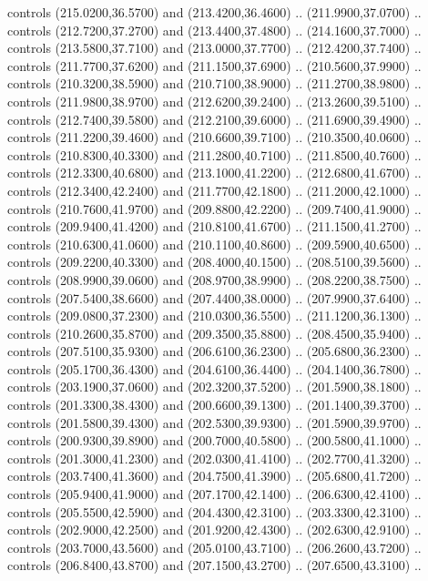 {\begin{scope}[y=0.80pt, x=0.80pt, yscale=-1, xscale=1, inner sep=0pt, outer sep=0pt, #1]
      controls (215.0200,36.5700) and (213.4200,36.4600) .. (211.9900,37.0700) ..
      controls (212.7200,37.2700) and (213.4400,37.4800) .. (214.1600,37.7000) ..
      controls (213.5800,37.7100) and (213.0000,37.7700) .. (212.4200,37.7400) ..
      controls (211.7700,37.6200) and (211.1500,37.6900) .. (210.5600,37.9900) ..
      controls (210.3200,38.5900) and (210.7100,38.9000) .. (211.2700,38.9800) ..
      controls (211.9800,38.9700) and (212.6200,39.2400) .. (213.2600,39.5100) ..
      controls (212.7400,39.5800) and (212.2100,39.6000) .. (211.6900,39.4900) ..
      controls (211.2200,39.4600) and (210.6600,39.7100) .. (210.3500,40.0600) ..
      controls (210.8300,40.3300) and (211.2800,40.7100) .. (211.8500,40.7600) ..
      controls (212.3300,40.6800) and (213.1000,41.2200) .. (212.6800,41.6700) ..
      controls (212.3400,42.2400) and (211.7700,42.1800) .. (211.2000,42.1000) ..
      controls (210.7600,41.9700) and (209.8800,42.2200) .. (209.7400,41.9000) ..
      controls (209.9400,41.4200) and (210.8100,41.6700) .. (211.1500,41.2700) ..
      controls (210.6300,41.0600) and (210.1100,40.8600) .. (209.5900,40.6500) ..
      controls (209.2200,40.3300) and (208.4000,40.1500) .. (208.5100,39.5600) ..
      controls (208.9900,39.0600) and (208.9700,38.9900) .. (208.2200,38.7500) ..
      controls (207.5400,38.6600) and (207.4400,38.0000) .. (207.9900,37.6400) ..
      controls (209.0800,37.2300) and (210.0300,36.5500) .. (211.1200,36.1300) ..
      controls (210.2600,35.8700) and (209.3500,35.8800) .. (208.4500,35.9400) ..
      controls (207.5100,35.9300) and (206.6100,36.2300) .. (205.6800,36.2300) ..
      controls (205.1700,36.4300) and (204.6100,36.4400) .. (204.1400,36.7800) ..
      controls (203.1900,37.0600) and (202.3200,37.5200) .. (201.5900,38.1800) ..
      controls (201.3300,38.4300) and (200.6600,39.1300) .. (201.1400,39.3700) ..
      controls (201.5800,39.4300) and (202.5300,39.9300) .. (201.5900,39.9700) ..
      controls (200.9300,39.8900) and (200.7000,40.5800) .. (200.5800,41.1000) ..
      controls (201.3000,41.2300) and (202.0300,41.4100) .. (202.7700,41.3200) ..
      controls (203.7400,41.3600) and (204.7500,41.3900) .. (205.6800,41.7200) ..
      controls (205.9400,41.9000) and (207.1700,42.1400) .. (206.6300,42.4100) ..
      controls (205.5500,42.5900) and (204.4300,42.3100) .. (203.3300,42.3100) ..
      controls (202.9000,42.2500) and (201.9200,42.4300) .. (202.6300,42.9100) ..
      controls (203.7000,43.5600) and (205.0100,43.7100) .. (206.2600,43.7200) ..
      controls (206.8400,43.8700) and (207.1500,43.2700) .. (207.6500,43.3100) ..

\end{scope}}
